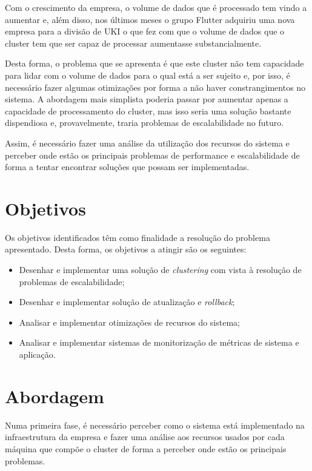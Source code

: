 Com o crescimento da empresa, o volume de dados que é processado tem vindo a aumentar e, além disso,
nos últimos meses o grupo Flutter adquiriu uma nova empresa para a divisão de \ac{UKI} o que fez 
com que o volume de dados que o \gls{cluster} tem que ser capaz de processar aumentasse 
substancialmente.

Desta forma, o problema que se apresenta é que este \gls{cluster} não tem capacidade para lidar
com o volume de dados para o qual está a ser sujeito e, por isso, é necessário fazer algumas
otimizações por forma a não haver constrangimentos no sistema. A abordagem mais simplista poderia 
passar por aumentar apenas a capacidade de processamento do \gls{cluster}, mas isso seria uma 
solução bastante dispendiosa e, provavelmente, traria problemas de escalabilidade no futuro.

Assim, é necessário fazer uma análise da utilização dos recursos do sistema e perceber onde estão 
os principais problemas de performance e escalabilidade de forma a tentar encontrar soluções que 
possam ser implementadas. 

\section{Objetivos}

Os objetivos identificados têm como finalidade a resolução do problema apresentado. Desta forma, 
os objetivos a atingir são os seguintes:

\begin{itemize}
  \item Desenhar e implementar uma solução de \textit{clustering} com vista à resolução de problemas
    de escalabilidade;
  \item Desenhar e implementar solução de atualização e \textit{rollback};
  \item Analisar e implementar otimizações de recursos do sistema;
  \item Analisar e implementar sistemas de monitorização de métricas de sistema e aplicação.
\end{itemize}

\section{Abordagem}

Numa primeira fase, é necessário perceber como o sistema está implementado na infraestrutura da 
empresa e fazer uma análise aos recursos usados por cada máquina que compõe o \gls{cluster} de 
forma a perceber onde estão os principais problemas. 

